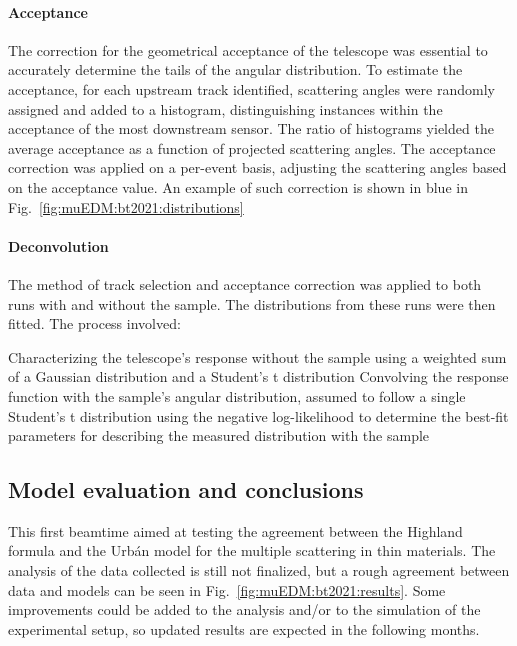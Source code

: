 \begin{refsection}
        \paragraph{Acceptance}
        The correction for the geometrical acceptance of the telescope was essential to accurately determine the tails of the angular distribution.
        To estimate the acceptance, for each upstream track identified, scattering angles were randomly assigned and added to a histogram, distinguishing instances within the acceptance of the most downstream sensor. 
        The ratio of histograms yielded the average acceptance as a function of projected scattering angles. 
        The acceptance correction was applied on a per-event basis, adjusting the scattering angles based on the acceptance value. 
        An example of such correction is shown in blue in Fig.~\ref{fig:muEDM:bt2021:distributions}
        
        \paragraph{Deconvolution}
        The method of track selection and acceptance correction was applied to both runs with and without the sample. 
        The distributions from these runs were then fitted.
        The process involved:
        \begin{outline}
            \1 Characterizing the telescope's response without the sample using a weighted sum of a Gaussian distribution and a Student's t distribution
            \1 Convolving the response function with the sample's angular distribution, assumed to follow a single Student's t distribution
            \1 using the negative log-likelihood to determine the best-fit parameters for describing the measured distribution with the sample
        \end{outline}
    
    \subsection{Model evaluation and conclusions}
        This first beamtime aimed at testing the agreement between the Highland formula and the \gf Urb\'{a}n model for the multiple scattering in thin materials.
        The analysis of the data collected is still not finalized, but a rough agreement between data and models can be seen in Fig.~\ref{fig:muEDM:bt2021:results}.
        Some improvements could be added to the analysis and/or to the simulation of the experimental setup, so updated results are expected in the following months.
        

\end{refsection}
